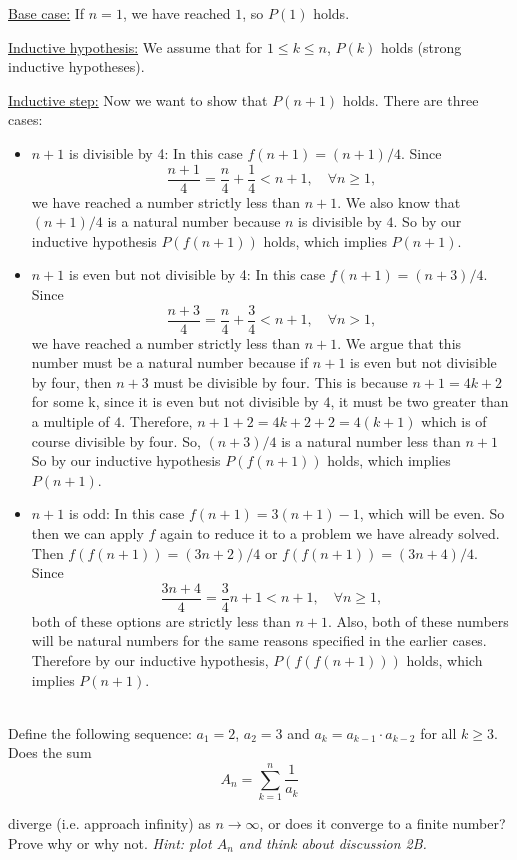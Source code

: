 \documentclass[11pt]{article}
\begin{document}
\begin{qunlist}
{\underline{Base case:} If $n=1$, we have reached $1$, so $P(1)$ holds.

\underline{Inductive hypothesis:} We assume that for $1 \leq k \leq n$, 
$P(k)$ holds (strong inductive hypotheses).

\underline{Inductive step:} Now we want to show that $P(n+1)$ holds. There are three cases:
\begin{itemize}
\item $n+1$ is divisible by 4: In this case $f(n+1) = (n+1)/4$. 
Since 
\[ \frac{n+1}{4} = \frac{n}{4} + \frac{1}{4} < n+1, \quad \forall n \geq 1, \]
we have reached a number strictly less than $n+1$. We also know that  $(n+1)/4$ is a natural number because $n$ is divisible by $4$. So by our inductive hypothesis $P(f(n+1))$ holds, which implies $P(n+1)$.
\item $n+1$ is even but not divisible by 4: In this case $f(n+1) = (n+3)/4$. 
Since 
\[ \frac{n+3}{4} = \frac{n}{4} + \frac{3}{4} < n+1, \quad \forall n > 1, \]
we have reached a number strictly less than $n+1$. We argue that this number must be a natural number because if $n+1$ is even but not divisible by four, then $n+3$ must be divisible by four. This is because $n+1 = 4k + 2$ for some k, since it is even but not divisible by $4$, it must be two greater than a multiple of $4$. Therefore, $n + 1 + 2 = 4k + 2 + 2 = 4(k+1)$ which is of course divisible by four. So, $(n+3)/4$ is a natural number less than $n+1$ So by our inductive hypothesis $P(f(n+1))$ holds, which implies $P(n+1)$.
\item $n+1$ is odd: In this case $f(n+1) = 3(n+1) - 1$, which will be even.  
So then we can apply $f$ again to reduce it to a problem we have already solved.  
Then $f(f(n+1)) = (3n+2)/4$ or $f(f(n+1)) = (3n+4)/4$. Since
\[ \frac{3n+4}{4} = \frac{3}{4} n + 1 < n+1, \quad \forall n\geq 1, \]
both of these options are strictly less than $n+1$. Also, both of these numbers will be natural numbers for the same reasons specified in the earlier cases.
Therefore by our inductive hypothesis, $P(f(f(n+1)))$ holds, which implies $P(n+1)$.
\end{itemize}
}
\fi

\pagebreak

 \\
Define the following sequence: $a_1 =2$, $a_2 = 3$ and $a_k = a_{k-1} \cdot a_{k-2}$ for all $k \geq 3$. \\ 
Does the sum 
\[ A_n = \sum_{k=1}^n \frac{1}{a_k} \]

diverge (i.e. approach infinity) as $n \to \infty$, or does it converge to a finite number?  
Prove why or why not.
{\em Hint: plot $A_n$ and think about discussion 2B.}


\end{qunlist}
\end{document}
